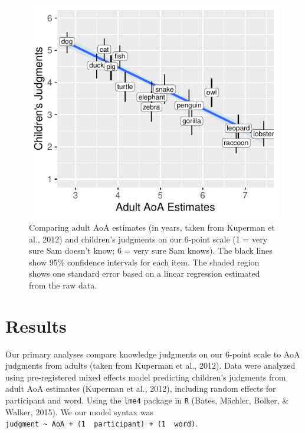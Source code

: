\documentclass[10pt, letterpaper]{article}
\newenvironment{CodeChunk}{}{}
\begin{document}
\begin{CodeChunk}
\begin{figure}[tb]
\includegraphics{figs/overall-1} \caption[Comparing adult AoA estimates (in years, taken from Kuperman et al., 2012) and children’s judgments on our 6-point scale (1 = very sure Sam doesn’t know]{Comparing adult AoA estimates (in years, taken from Kuperman et al., 2012) and children’s judgments on our 6-point scale (1 = very sure Sam doesn’t know; 6 = very sure Sam knows). The black lines show 95\% confidence intervals for each item. The shaded region shows one standard error based on a linear regression estimated from the raw data.}\label{fig:overall}
\end{figure}
\end{CodeChunk}

\hypertarget{results}{%
\section{Results}\label{results}}

Our primary analyses compare knowledge judgments on our 6-point scale to
AoA judgments from adults (taken from Kuperman et al., 2012). Data were
analyzed using pre-registered mixed effects model predicting children's
judgments from adult AoA estimates (Kuperman et al., 2012), including
random effects for participant and word. Using the \texttt{lme4} package
in \texttt{R} (Bates, Mächler, Bolker, \& Walker, 2015). We our model
syntax was
\texttt{judgment\ \textasciitilde{}\ AoA\ +\ (1\ \textbar{}\ participant)\ +\ (1\ \textbar{}\ word)}.
\end{document}
